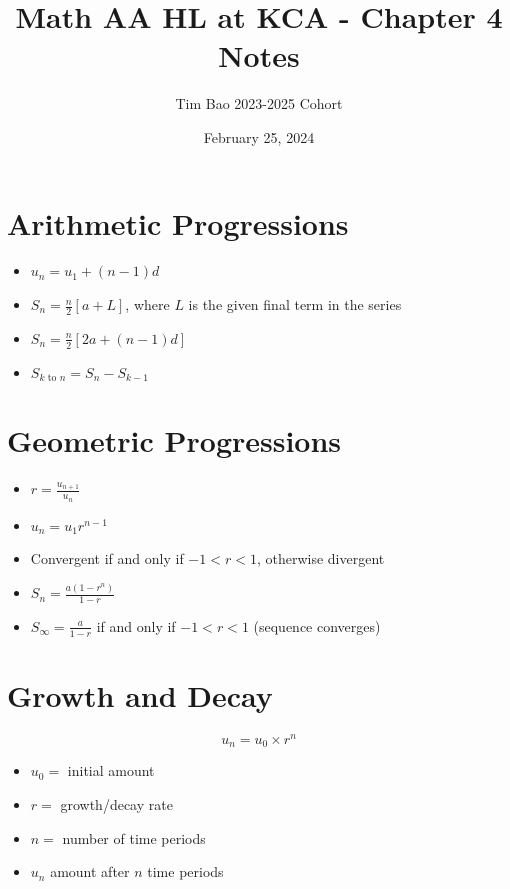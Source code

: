 \documentclass[11pt]{article}
\title{Math AA HL at KCA - Chapter 4 Notes}
\author{Tim Bao 2023-2025 Cohort}
\date{February 25, 2024}
\begin{document}
\maketitle
\pagebreak

\section{Arithmetic Progressions}

\begin{itemize}
  \setlength\itemsep{1em}
  \item $u_n = u_1 + (n - 1)d$
  \item $S_n = \frac{n}{2}\left[a + L\right]$, where $L$ is the given final term in the series
  \item $S_n = \frac{n}{2}\left[2a + (n - 1)d\right]$
  \item $S_{k \text{ to } n} = S_{n} - S_{k - 1}$
\end{itemize}

\section{Geometric Progressions}

\begin{itemize}
  \setlength\itemsep{1em}
  \item $r = \frac{u_{n + 1}}{u_n}$
  \item $u_n = u_1r^{n - 1}$
  \item Convergent if and only if $-1 < r < 1$, otherwise divergent
  \item $S_n = \frac{a(1 - r^n)}{1 - r}$
  \item $S_\infty = \frac{a}{1 - r}$ if and only if $-1 < r < 1$ (sequence converges)
\end{itemize}

\section{Growth and Decay}

$$u_n = u_0 \times r^n$$

\begin{itemize}
  \item $u_0 = $ initial amount
  \item $r = $ growth/decay rate
  \item $n = $ number of time periods
  \item $u_n$ amount after $n$ time periods
\end{itemize}
\end{document}
